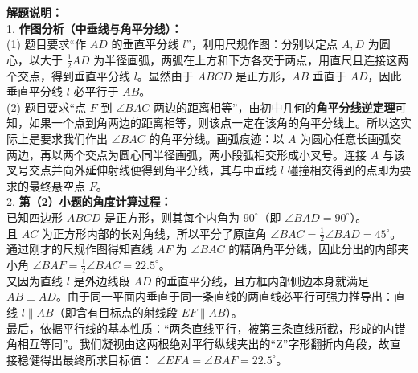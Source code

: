 {\small\color{gray}
\textbf{解题说明：}\\
1. \textbf{作图分析（中垂线与角平分线）：}\\
(1) 题目要求“作 $AD$ 的垂直平分线 $l$”，利用尺规作图：分别以定点 $A, D$ 为圆心，以大于 $\frac{1}{2}AD$ 为半径画弧，两弧在上方和下方各交于两点，用直尺且连接这两个交点，得到垂直平分线 $l$。显然由于 $ABCD$ 是正方形，$AB$ 垂直于 $AD$，因此垂直平分线 $l$ 必平行于 $AB$。\\
(2) 题目要求“点 $F$ 到 $\angle BAC$ 两边的距离相等”，由初中几何的\textbf{角平分线逆定理}可知，如果一个点到角两边的距离相等，则该点一定在该角的角平分线上。所以这实际上是要求我们作出 $\angle BAC$ 的角平分线。画弧痕迹：以 $A$ 为圆心任意长画弧交两边，再以两个交点为圆心同半径画弧，两小段弧相交形成小叉号。连接 $A$ 与该叉号交点并向外延伸射线便得到角平分线，其与中垂线 $l$ 碰撞相交得到的点即为要求的最终悬空点 $F$。\\
2. \textbf{第（2）小题的角度计算过程：}\\
已知四边形 $ABCD$ 是正方形，则其每个内角为 $90^\circ$（即 $\angle BAD = 90^\circ$）。\\
且 $AC$ 为正方形内部的长对角线，所以平分了原直角 $\angle BAC = \frac{1}{2}\angle BAD = 45^\circ$。\\
通过刚才的尺规作图得知直线 $AF$ 为 $\angle BAC$ 的精确角平分线，因此分出的内部夹小角 $\angle BAF = \frac{1}{2}\angle BAC = 22.5^\circ$。\\
又因为直线 $l$ 是外边线段 $AD$ 的垂直平分线，且方框内部侧边本身就满足 $AB \perp AD$。由于同一平面内垂直于同一条直线的两直线必平行可强力推导出：直线 $l \parallel AB$（即含有目标点的射线段 $EF \parallel AB$）。\\
最后，依据平行线的基本性质：“两条直线平行，被第三条直线所截，形成的内错角相互等同”。我们凝视由这两根绝对平行纵线夹出的“Z”字形翻折内角段，故直接稳健得出最终所求目标值： $\angle EFA = \angle BAF = 22.5^\circ$。
}

\vspace{0.6cm}

